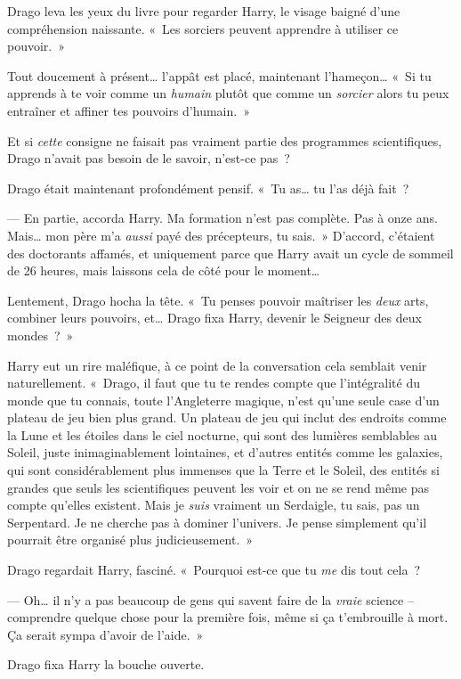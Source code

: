 Drago leva les yeux du livre pour regarder Harry, le visage baigné d'une compréhension naissante. «~Les sorciers peuvent apprendre à utiliser ce pouvoir.~»

Tout doucement à présent… l'appât est placé, maintenant l'hameçon…
«~Si tu apprends à te voir comme un \emph{humain} plutôt que comme un \emph{sorcier} alors tu peux entraîner et affiner tes pouvoirs d'humain.~»

Et si \emph{cette} consigne ne faisait pas vraiment partie des programmes scientifiques, Drago n'avait pas besoin de le savoir, n'est-ce pas~?

Drago était maintenant profondément pensif.
«~Tu as… tu l'as déjà fait~?

--- En partie, accorda Harry. Ma formation n'est pas complète. Pas à onze ans.
Mais… mon père m'a \emph{aussi} payé des précepteurs, tu sais.~»
D'accord, c'étaient des doctorants affamés, et uniquement parce que Harry avait un cycle de sommeil de 26 heures, mais laissons cela de côté pour le moment…

Lentement, Drago hocha la tête. «~Tu penses pouvoir maîtriser les \emph{deux} arts, combiner leurs pouvoirs, et… Drago fixa Harry, devenir le Seigneur des deux mondes~?~»

Harry eut un rire maléfique, à ce point de la conversation cela semblait venir naturellement.
«~Drago, il faut que tu te rendes compte que l'intégralité du monde que tu connais, toute l'Angleterre magique, n'est qu'une seule case d'un plateau de jeu bien plus grand.
Un plateau de jeu qui inclut des endroits comme la Lune et les étoiles dans le ciel nocturne, qui sont des lumières semblables au Soleil, juste inimaginablement lointaines, et d'autres entités comme les galaxies, qui sont considérablement plus immenses que la Terre et le Soleil, des entités si grandes que seuls les scientifiques peuvent les voir et on ne se rend même pas compte qu'elles existent.
Mais je \emph{suis} vraiment un Serdaigle, tu sais, pas un Serpentard.
Je ne cherche pas à dominer l'univers.
Je pense simplement qu'il pourrait être organisé plus judicieusement.~»

Drago regardait Harry, fasciné.  «~Pourquoi est-ce que tu \emph{me} dis tout cela~?

--- Oh… il n'y a pas beaucoup de gens qui savent faire de la \emph{vraie} science -- comprendre quelque chose pour la première fois, même si ça t'embrouille à mort.
Ça serait sympa d'avoir de l'aide.~»

Drago fixa Harry la bouche ouverte.

